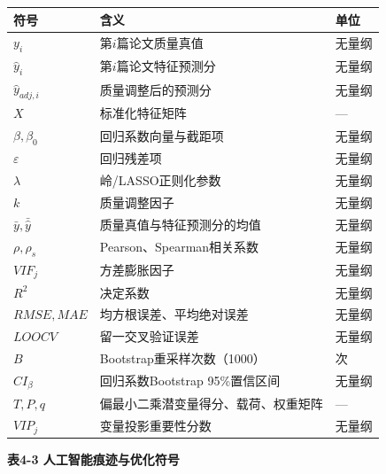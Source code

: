 \documentclass[withoutpreface]{cumcmthesis}
\begin{document}
\begin{table}[htbp]
\centering
\small
\begin{tabularx}{\textwidth}{XXX}
\toprule
符号 & 含义 & 单位 \\
\midrule
$y_i$ & 第$i$篇论文质量真值 & 无量纲 \\
$\hat y_i$ & 第$i$篇论文特征预测分 & 无量纲 \\
$\hat y_{adj,i}$ & 质量调整后的预测分 & 无量纲 \\
$X$ & 标准化特征矩阵 & — \\
$\beta,\beta_0$ & 回归系数向量与截距项 & 无量纲 \\
$\varepsilon$ & 回归残差项 & 无量纲 \\
$\lambda$ & 岭/LASSO正则化参数 & 无量纲 \\
$k$ & 质量调整因子 & 无量纲 \\
$\bar y,\bar{\hat y}$ & 质量真值与特征预测分的均值 & 无量纲 \\
$\rho,\rho_s$ & Pearson、Spearman相关系数 & 无量纲 \\
$VIF_j$ & 方差膨胀因子 & 无量纲 \\
$R^2$ & 决定系数 & 无量纲 \\
$RMSE,MAE$ & 均方根误差、平均绝对误差 & 无量纲 \\
$LOOCV$ & 留一交叉验证误差 & 无量纲 \\
$B$ & Bootstrap重采样次数（1000） & 次 \\
$CI_{\beta}$ & 回归系数Bootstrap 95\%置信区间 & 无量纲 \\
$T,P,q$ & 偏最小二乘潜变量得分、载荷、权重矩阵 & — \\
$VIP_j$ & 变量投影重要性分数 & 无量纲 \\
\bottomrule
\end{tabularx}
\end{table}
\textbf{表4-3 人工智能痕迹与优化符号}
\end{document}

